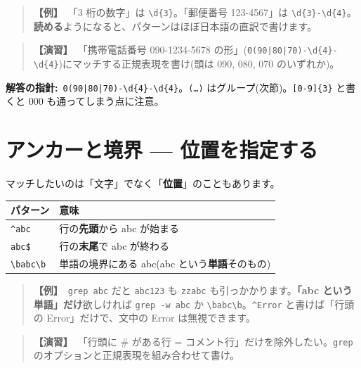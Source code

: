 \documentclass{article}
\begin{document}
\begin{quote}
\textbf{【例】}\ 「3 桁の数字」は \texttt{\textbackslash d\{3\}}。「郵便番号 123-4567」は \texttt{\textbackslash d\{3\}-\textbackslash d\{4\}}。\textbf{読める}ようになると、パターンはほぼ日本語の直訳で書けます。
\end{quote}

\begin{quote}
\textbf{【演習】}\ 「携帯電話番号 090-1234-5678 の形」(\texttt{0(90|80|70)-\textbackslash d\{4\}-\textbackslash d\{4\}})にマッチする正規表現を書け(頭は 090, 080, 070 のいずれか)。
\end{quote}

\textbf{解答の指針:}\ \texttt{0(90|80|70)-\textbackslash d\{4\}-\textbackslash d\{4\}}。\texttt{(…)} はグループ(次節)。\texttt{[0-9]\{3\}} と書くと 000 も通ってしまう点に注意。

\section{アンカーと境界 — 位置を指定する}

マッチしたいのは「文字」でなく「\textbf{位置}」のこともあります。

\begin{center}
\begin{tabular}{|l|l|}
\hline
パターン & 意味 \\
\hline
\texttt{\^{}abc} & 行の\textbf{先頭}から abc が始まる \\
\texttt{abc\$} & 行の\textbf{末尾}で abc が終わる \\
\texttt{\textbackslash babc\textbackslash b} & 単語の境界にある abc(abc という\textbf{単語}そのもの) \\
\hline
\end{tabular}
\end{center}

\begin{quote}
\textbf{【例】}\ \texttt{grep abc} だと \texttt{abc123} も \texttt{zzabc} も引っかかります。\textbf{「abc という単語」だけ}欲しければ \texttt{grep -w abc} か \texttt{\textbackslash babc\textbackslash b}。\texttt{\^{}Error} と書けば「行頭の Error」だけで、文中の Error は無視できます。
\end{quote}

\begin{quote}
\textbf{【演習】}\ 「行頭に \# がある行 = コメント行」だけを除外したい。\texttt{grep} のオプションと正規表現を組み合わせて書け。
\end{quote}
\end{document}
